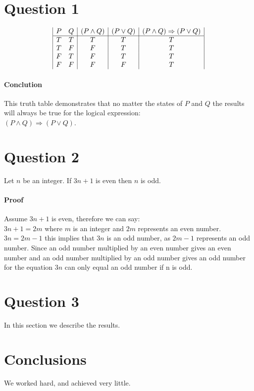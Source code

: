 \documentclass[12pt]{article}
\begin{document}
\maketitle


\section*{Question 1}
\begin{displaymath}
\begin{array}{|c c|c|c|c|}

P & Q & (P \land Q) & (P \lor Q) & (P \land Q) \Rightarrow (P \lor Q)\\
\hline 
T & T & T & T & T\\
T & F & F & T & T\\
F & T & F & T & T\\
F & F & F & F & T\\
\end{array}
\end{displaymath}

\paragraph{Conclution}
This truth table demonstrates that no matter the states of $P$ and $Q$ the results will always be true for the logical expression:\\ $(P \land Q) \Rightarrow (P \lor Q)$.

\section*{Question 2}
Let $n$ be an integer.  If $3n+ 1$ is even then $n$ is odd.
\paragraph{Proof}
Assume $3n + 1$ is even, therefore we can say:\\
$3n + 1 = 2m$ where $m$ is an integer and $2m$ represents an even number.
$3n = 2m - 1$ this implies that $3n$ is an odd number, as $2m - 1$ represents an odd number.
Since an odd number multiplied by an even number gives an even number and an odd number multiplied by an odd number gives an odd number for the equation $3n$ can only equal an odd number if n is odd.

\section*{Question 3}\label{results}
In this section we describe the results.

\section{Conclusions}\label{conclusions}
We worked hard, and achieved very little.



\end{document}
